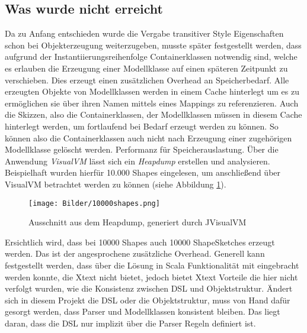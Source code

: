 \subsection{Was wurde nicht erreicht}
Da zu Anfang entschieden wurde die Vergabe transitiver Style Eigenschaften schon bei Objekterzeugung weiterzugeben, musste später festgestellt werden, dass aufgrund der Instantiierungsreihenfolge Containerklassen notwendig sind, welche es erlauben die Erzeugung einer Modellklasse auf einen späteren Zeitpunkt zu verschieben. Dies erzeugt einen zusätzlichen Overhead an Speicherbedarf. Alle erzeugten Objekte von Modellklassen werden in einem Cache hinterlegt um es zu ermöglichen sie über ihren Namen mittels eines Mappings zu referenzieren. Auch die Skizzen, also die Containerklassen, der Modellklassen müssen in diesem Cache hinterlegt werden, um fortlaufend bei Bedarf erzeugt werden zu können. So können also die Containerklassen auch nicht nach Erzeugung einer zugehörigen Modellklasse gelöscht werden. Performanz für Speicherauslastung.
Über die Anwendung \textit{VisualVM}  lässt sich ein \textit{Heapdump} erstellen und analysieren. Beispielhaft wurden hierfür 10.000 Shapes eingelesen, um anschließend über VisualVM betrachtet werden zu können (siehe Abbildung \ref{jvisualvm}).
\begin{figure}[h]
	\begin{center}
		\texttt{[image: Bilder/10000shapes.png]}
		\caption{Ausschnitt aus dem Heapdump, generiert durch JVisualVM}
		\label{jvisualvm}
	\end{center}
\end{figure}Ersichtlich wird, dass bei 10000 Shapes auch 10000 ShapeSketches erzeugt werden. Das ist der angesprochene zusätzliche Overhead.
Generell kann festgestellt werden, dass über die Lösung in Scala Funktionalität mit eingebracht werden konnte, die Xtext nicht bietet, jedoch bietet Xtext Vorteile die hier nicht verfolgt wurden, wie die Konsistenz zwischen DSL und Objektstruktur. Ändert sich in diesem Projekt die DSL oder die Objektstruktur, muss von Hand dafür gesorgt werden, dass Parser und Modellklassen konsistent bleiben. Das liegt daran, dass die DSL nur implizit über die Parser Regeln definiert ist.
